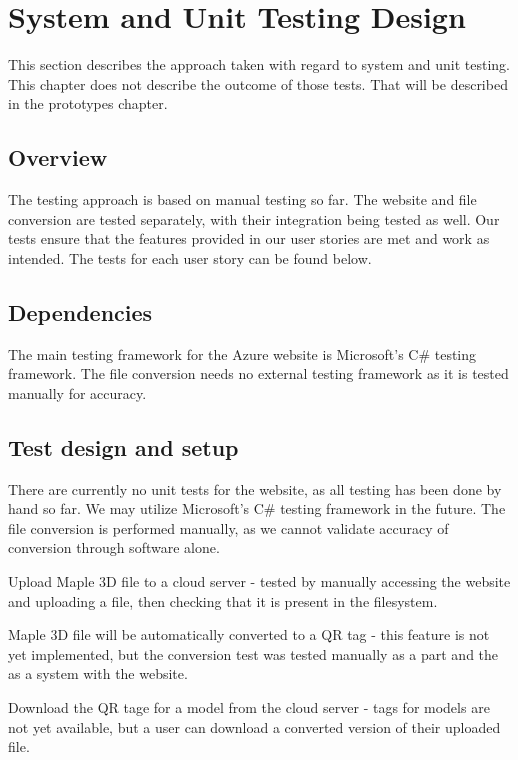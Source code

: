 

\chapter{System and Unit Testing Design}

This section describes the approach taken with regard to system and unit testing.    This chapter does not describe the outcome of those tests.  That will be described in the prototypes chapter.     

\section{Overview}
The testing approach is based on manual testing so far. 
The website and file conversion are tested separately, with their integration being tested as well.
Our tests ensure that the features provided in our user stories are met and work as intended.
The tests for each user story can be found below.

\section{Dependencies}
The main testing framework for the Azure website is Microsoft's C\# testing framework.
The file conversion needs no external testing framework as it is tested manually for accuracy.

\section{Test design and setup}
There are currently no unit tests for the website, as all testing has been done by hand so far.
We may utilize Microsoft's C\# testing framework in the future.
The file conversion is performed manually, as we cannot validate accuracy of conversion through software alone.

Upload Maple 3D file to a cloud server - tested by manually accessing the website and uploading a file, then checking that it is present in the filesystem.

Maple 3D file will be automatically converted to a QR tag - this feature is not yet implemented, but the conversion test was tested manually as a part and the as a system with the website.

Download the QR tage for a model from the cloud server - tags for models are not yet available, but a user can download a converted version of their uploaded file.

